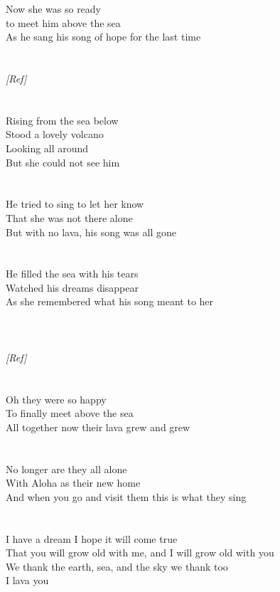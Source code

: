 {{Now she was so ready\\
to meet him above the sea\\
As he sang his song of hope for the last time}\\
\\\noindent\vbox{~\\
\emph{[Ref]}}\\
\\\noindent\vbox{~\\
Rising from the sea below\\
Stood a lovely volcano\\
Looking all around\\
But she could not see him}\\
\\\noindent\vbox{~\\
He tried to sing to let her know\\
That she was not there alone\\
But with no lava, his song was all gone}\\
\\\noindent\vbox{~\\
He filled the sea with his tears\\
Watched his dreams disappear\\
As she remembered what his song meant to her}\\
\\\noindent\vbox{~\\
\\
\emph{[Ref]}}\\
\\\noindent\vbox{~\\
Oh they were so happy\\
To finally meet above the sea\\
All together now their lava grew and grew}\\
\\\noindent\vbox{~\\
No longer are they all alone\\
With Aloha as their new home\\
And when you go and visit them this is what they sing}\\
\\\noindent\vbox{~\\
I have a dream I hope it will come true\\
That you will grow old with me, and I will grow old with you\\
We thank the earth, sea, and the sky we thank too\\
I lava you}
}


